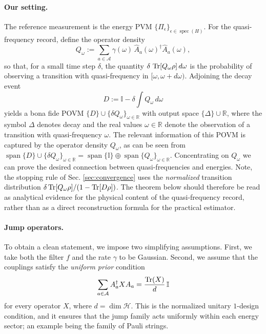 \documentclass[showpacs,amsmath,amssymb,twocolumn,prx,superscriptaddress,10pt,aps,nofootinbib]{revtex4-2}
\newcommand{\bbI}{\mathbb{I}}
\newcommand{\bbR}{\mathbb{R}}
\newcommand{\vspan}{\operatorname{span}}
\begin{document}
\paragraph{Our setting.} The reference measurement is the energy PVM $\{\Pi_{\epsilon}\}_{\epsilon\in\operatorname{spec}(H)}$. For the quasi-frequency record, define the operator density
\begin{equation}
    Q_{\omega} := \sum_{a\in\mathcal A} \gamma(\omega)\,\hat A_a(\omega)^{\dagger}\hat A_a(\omega),
\end{equation}
so that, for a small time step $\delta$, the quantity $\delta\,\Tr[Q_{\omega}\rho]\,d\omega$ is the probability of observing a transition with quasi-frequency in $[\omega,\omega+d\omega)$. Adjoining the decay event
\begin{equation}
    D := \bbI - \delta\int Q_{\omega}\,d\omega
\end{equation}
yields a bona fide POVM $\{D\}\cup\{\delta Q_{\omega}\}_{\omega\in\mathbb R}$ with output space $\{\Delta \} \cup \bbR$, where the symbol $\Delta$ denotes decay and the real values $\omega\in\bbR$ denote the observation of a transition with quasi-frequency $\omega$. The relevant information of this POVM is captured by the operator density $Q_{\omega}$, as can be seen from $\vspan \{D\} \cup \{\delta Q_{\omega}\}_{\omega\in\bbR} = \vspan \{\bbI\} \oplus \vspan \{Q_{\omega}\}_{\omega\in\bbR}$. Concentrating on $Q_{\omega}$ we can prove the desired connection between quasi-frequencies and energies. Note, the stopping rule of Sec. \ref{sec:convergence} uses the \emph{normalized} transition distribution $\delta \Tr[Q_{\omega} \rho] / (1 - \Tr[D \rho])$. The theorem below should therefore be read as analytical evidence for the physical content of the quasi-frequency record, rather than as a direct reconstruction formula for the practical estimator.

\paragraph{Jump operators.} To obtain a clean statement, we impose two simplifying assumptions. First, we take both the filter $f$ and the rate $\gamma$ to be Gaussian. Second, we assume that the couplings satisfy the \emph{uniform prior} condition
\begin{equation}
\label{eq:uniform_prior}
    \sum_{a\in\mathcal A} A_a^\dagger X A_a
    =
    \frac{\Tr(X)}{d}\,\bbI
\end{equation}
for every operator $X$, where $d=\dim\mathcal H$. This is the normalized unitary $1$-design condition, and it ensures that the jump family acts uniformly within each energy sector; an example being the family of Pauli strings.
\end{document}
